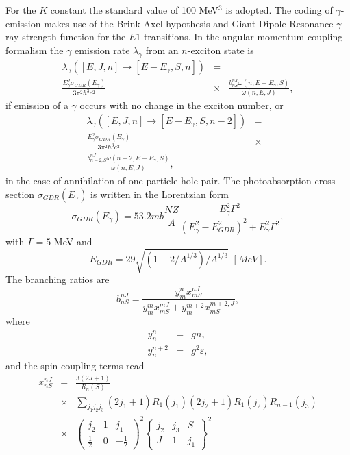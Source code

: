 \documentclass[twocolumn,amsmath,amssymb,10pt,groupedaddress,a4paper]{revtex4}
\begin{document}
For the $K$ constant the standard value of 100 MeV$^{3}$ is adopted.
The coding of $\gamma$-emission makes use of the Brink-Axel hypothesis
\cite{Axel,Brink,Brinka} and Giant Dipole Resonance $\gamma$-ray
strength function for the $E1$ transitions. In the angular momentum
coupling formalism the $\gamma$ emission rate $\lambda_{\gamma}$
from an $n$-exciton state is
\begin{eqnarray}
\lambda_{\gamma}\left(\left[E,J,n\right]\rightarrow\left[E-E_{\gamma},S,n\right]\right)&=&\\
\frac{E_{\gamma}^{2}\sigma_{GDR}(E_{\gamma})}{3\pi^{2}\hbar^{3}c^{2}}&\times&\frac{b_{nS}^{nJ}\omega(n,E-E_{\gamma},S)}{\omega(n,E,J)}
\nonumber,
\end{eqnarray}
 if emission of a $\gamma$ occurs with no change in the exciton number,
or
\begin{eqnarray}
\lambda_{\gamma}\left(\left[E,J,n\right]\rightarrow\left[E-E_{\gamma},S,n-2\right]\right)&=&\nonumber\\
\frac{E_{\gamma}^{2}\sigma_{GDR}(E_{\gamma})}{3\pi^{2}\hbar^{3}c^{2}}&\times&\nonumber\\
\frac{b_{n-2,S}^{nJ}\omega(n-2,E-E_{\gamma},S)}{\omega(n,E,J)},&&
\end{eqnarray}
 in the case of annihilation of one particle-hole pair. The photoabsorption
cross section $\sigma_{GDR}(E_{\gamma})$ is written in the Lorentzian
form
\begin{equation}
\sigma_{GDR}(E_{\gamma})=53.2mb\frac{NZ}{A}\frac{E_{\gamma}^{2}\Gamma^{2}}{\left(E_{\gamma}^{2}-E_{GDR}^{2}\right)^{2}+E_{\gamma}^{2}\Gamma^{2}},
\end{equation}
with $\Gamma=5$ MeV and
\begin{equation}
E_{GDR}=29\sqrt{\left(1+2/A^{1/3}\right)/A^{1/3}}\,\,[MeV].
\end{equation}
 The branching ratios are
\begin{equation}
b_{nS}^{nJ}=\frac{y_{m}^{n}x_{mS}^{nJ}}{y_{m}^{m}x_{mS}^{mJ}+y_{m}^{m+2}x_{mS}^{m+2,J}},
\end{equation}
\noindent where
\begin{eqnarray}
y_{n}^{n} & = & gn,\nonumber \\
y_{n}^{n+2} & = & g^{2}\varepsilon,
\end{eqnarray}
and the spin coupling terms read
\begin{eqnarray}
x_{nS}^{nJ} & = & \frac{3(2J+1)}{R_{n}(S)}\nonumber\\
& \times &\sum_{j_{1}j_{2}j_{3}}(2j_{1}+1)R_{1}(j_{1})(2j_{2}+1)R_{1}(j_{2})R_{n-1}(j_{3})\nonumber \\
 & \times & \left(\begin{array}{ccc}
j_{2} & 1 & j_{1}\\
\frac{1}{2} & 0 & -\frac{1}{2}\end{array}\right)^{2}\left\{ \begin{array}{ccc}
j_{2} & j_{3} & S\\
J & 1 & j_{1}\end{array}\right\} ^{2}
\end{eqnarray}
\end{document}
